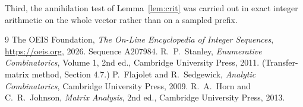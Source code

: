 \documentclass[11pt,a4paper]{article}
\theoremstyle{plain}
\theoremstyle{definition}
\begin{document}
Third, the annihilation test of Lemma~\ref{lem:crit} was carried out in exact integer
arithmetic on the whole vector rather than on a sampled prefix.

\begin{thebibliography}{9}
 The OEIS Foundation, \emph{The On-Line Encyclopedia of Integer
Sequences}, \url{https://oeis.org}, 2026. Sequence A207984.
 R.~P.~Stanley, \emph{Enumerative Combinatorics}, Volume 1, 2nd ed.,
Cambridge University Press, 2011. (Transfer-matrix method, Section 4.7.)
 P.~Flajolet and R.~Sedgewick, \emph{Analytic Combinatorics}, Cambridge
University Press, 2009.
 R.~A.~Horn and C.~R.~Johnson, \emph{Matrix Analysis}, 2nd ed., Cambridge
University Press, 2013.
\end{thebibliography}
\end{document}
